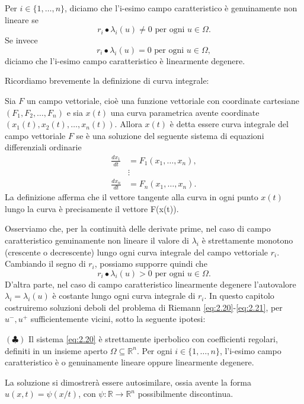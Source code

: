 \begin{definizione}
    Per $i\in\{1, \ldots, n\}$, diciamo che l'i-esimo campo caratteristico è genuinamente non lineare se
    \begin{equation*}
        r_{i}\bullet\lambda_{i}(u)\neq 0 \text{ per ogni } u\in\Omega.
    \end{equation*}
    Se invece
    \begin{equation*}
        r_{i}\bullet\lambda_{i}(u)= 0 \text{ per ogni } u\in\Omega,
    \end{equation*}
    diciamo che l'i-esimo campo caratteristico è linearmente degenere.
\end{definizione}

Ricordiamo brevemente la definizione di curva integrale:
\begin{definizione}
    Sia $F$ un campo vettoriale, cioè una funzione vettoriale con coordinate cartesiane $(F_{1}, F_{2}, \ldots , F_{n})$ e sia $x(t)$ una curva parametrica avente coordinate $(x_{1}(t), x_{2}(t), \ldots, x_{n}(t))$. Allora $x(t)$ è detta essere curva integrale del campo vettoriale $F$ se è una soluzione del seguente sistema di equazioni differenziali ordinarie
    \begin{align}\label{eq:2.24}
        \frac{dx_{1}}{dt}&=F_{1}(x_{1},\ldots,x_{n}),\nonumber \\
        &\vdots\nonumber \\
        \frac{dx_{n}}{dt}&=F_{n}(x_{1},\ldots,x_{n}).
    \end{align}
    La definizione afferma che il vettore tangente alla curva in ogni punto $x(t)$ lungo la curva è precisamente il vettore F(x(t)).
\end{definizione}
Osserviamo che, per la continuità delle derivate prime, nel caso di campo caratteristico genuinamente non lineare il valore di $\lambda_{i}$ è strettamente monotono (crescente o decrescente) lungo ogni curva integrale del campo vettoriale $r_{i}$. Cambiando il segno di $r_{i}$, possiamo supporre quindi che 
\begin{equation}\label{eq:2.25}
    r_{i}\bullet\lambda_{i}(u)>0 \text{ per ogni } u\in\Omega.
\end{equation}
D'altra parte, nel caso di campo caratteristico linearmente degenere l'autovalore $\lambda_{i}=\lambda_{i}(u)$ è costante lungo ogni curva integrale di $r_{i}$.
In questo capitolo costruiremo soluzioni deboli del problema di Riemann \eqref{eq:2.20}-\eqref{eq:2.21}, per $u^{-}, u^{+}$  sufficientemente vicini, sotto la seguente ipotesi:
\begin{description}
    \item {$(\clubsuit)$} Il sistema \eqref{eq:2.20} è strettamente iperbolico con coefficienti regolari, definiti in un insieme aperto $\Omega\subseteq\mathbb{R}^{n}$. Per ogni $i\in\{1,\ldots,n\}$, l'i-esimo campo caratteristico è o genuinamente lineare oppure linearmente degenere.
\end{description}
La soluzione si dimostrerà essere autosimilare, ossia avente la forma \\$u(x,t)=\psi(x/t)$, con $\psi\colon\mathbb{R}\rightarrow\mathbb{R}^{n}$ possibilmente discontinua.

